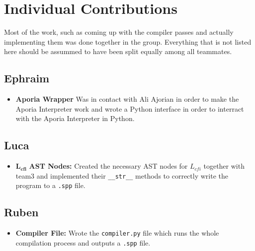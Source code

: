 \newpage
\section{Individual Contributions}
Most of the work, such as coming up with the compiler passes and actually implementing them was done together in the group. Everything that is not listed here should be assummed
to have been split equally among all teammates.
\subsection{Ephraim}

\begin{itemize}
	\item \textbf{Aporia Wrapper} Was in contact with Ali Ajorian in order to make the Aporia Interpreter work and wrote a Python interface in order to interract with the Aporia Interpreter in Python.
\end{itemize}

\subsection{Luca}

\begin{itemize}
	\item $\mathbf{L_{cfi}}$\textbf{ AST Nodes:} Created the necessary AST nodes for $L_{cfi}$ together with team3 and implemented their \texttt{\_\_str\_\_} methods to correctly write the program to a \texttt{.spp} file.
\end{itemize}

\subsection{Ruben}

\begin{itemize}
	\item \textbf{Compiler File:} Wrote the \texttt{compiler.py} file which runs the whole compilation process and outputs a \texttt{.spp} file.
\end{itemize}


